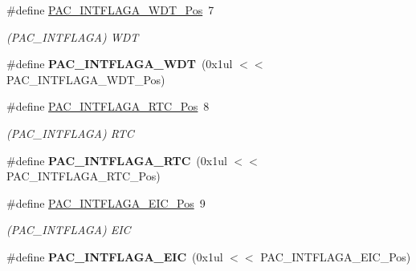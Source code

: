 \begin{DoxyCompactItemize}
\item 
\hypertarget{group___s_a_m_l21___p_a_c_ga89762a30c9ce064cb310ef9070a38f39}{}\#define \hyperlink{group___s_a_m_l21___p_a_c_ga89762a30c9ce064cb310ef9070a38f39}{P\+A\+C\+\_\+\+I\+N\+T\+F\+L\+A\+G\+A\+\_\+\+W\+D\+T\+\_\+\+Pos}~7\label{group___s_a_m_l21___p_a_c_ga89762a30c9ce064cb310ef9070a38f39}

\begin{DoxyCompactList}\small\item\em (P\+A\+C\+\_\+\+I\+N\+T\+F\+L\+A\+G\+A) W\+D\+T \end{DoxyCompactList}\item 
\hypertarget{group___s_a_m_l21___p_a_c_ga35bf91ae0b64f5902cd270556f7bf47d}{}\#define {\bfseries P\+A\+C\+\_\+\+I\+N\+T\+F\+L\+A\+G\+A\+\_\+\+W\+D\+T}~(0x1ul $<$$<$ P\+A\+C\+\_\+\+I\+N\+T\+F\+L\+A\+G\+A\+\_\+\+W\+D\+T\+\_\+\+Pos)\label{group___s_a_m_l21___p_a_c_ga35bf91ae0b64f5902cd270556f7bf47d}

\item 
\hypertarget{group___s_a_m_l21___p_a_c_ga3395ee0d9089942d7695d0a5cb854579}{}\#define \hyperlink{group___s_a_m_l21___p_a_c_ga3395ee0d9089942d7695d0a5cb854579}{P\+A\+C\+\_\+\+I\+N\+T\+F\+L\+A\+G\+A\+\_\+\+R\+T\+C\+\_\+\+Pos}~8\label{group___s_a_m_l21___p_a_c_ga3395ee0d9089942d7695d0a5cb854579}

\begin{DoxyCompactList}\small\item\em (P\+A\+C\+\_\+\+I\+N\+T\+F\+L\+A\+G\+A) R\+T\+C \end{DoxyCompactList}\item 
\hypertarget{group___s_a_m_l21___p_a_c_gaa18bdf79edfab38de39276e82baad658}{}\#define {\bfseries P\+A\+C\+\_\+\+I\+N\+T\+F\+L\+A\+G\+A\+\_\+\+R\+T\+C}~(0x1ul $<$$<$ P\+A\+C\+\_\+\+I\+N\+T\+F\+L\+A\+G\+A\+\_\+\+R\+T\+C\+\_\+\+Pos)\label{group___s_a_m_l21___p_a_c_gaa18bdf79edfab38de39276e82baad658}

\item 
\hypertarget{group___s_a_m_l21___p_a_c_ga9401973db26dc04699c92c7213d58a71}{}\#define \hyperlink{group___s_a_m_l21___p_a_c_ga9401973db26dc04699c92c7213d58a71}{P\+A\+C\+\_\+\+I\+N\+T\+F\+L\+A\+G\+A\+\_\+\+E\+I\+C\+\_\+\+Pos}~9\label{group___s_a_m_l21___p_a_c_ga9401973db26dc04699c92c7213d58a71}

\begin{DoxyCompactList}\small\item\em (P\+A\+C\+\_\+\+I\+N\+T\+F\+L\+A\+G\+A) E\+I\+C \end{DoxyCompactList}\item 
\hypertarget{group___s_a_m_l21___p_a_c_gaa29561d48f90b00aaafd63d9b00c49e7}{}\#define {\bfseries P\+A\+C\+\_\+\+I\+N\+T\+F\+L\+A\+G\+A\+\_\+\+E\+I\+C}~(0x1ul $<$$<$ P\+A\+C\+\_\+\+I\+N\+T\+F\+L\+A\+G\+A\+\_\+\+E\+I\+C\+\_\+\+Pos)\label{group___s_a_m_l21___p_a_c_gaa29561d48f90b00aaafd63d9b00c49e7}


\end{DoxyCompactItemize}
